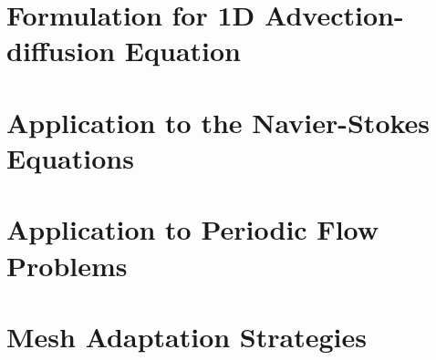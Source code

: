 \section{Formulation for 1D Advection-diffusion Equation}

\label{sec:1D_AD}

\section{Application to the Navier-Stokes Equations}


\section{Application to Periodic Flow Problems}

\label{sec:app_to_periodic}

\section{Mesh Adaptation Strategies}

\label{sec:adapt_strat_overview}





